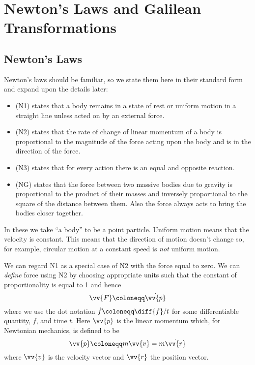 \chapter{Newton's Laws and Galilean Transformations}
    \section{Newton's Laws}
    Newton's laws should be familiar, so we state them here in their standard form and expand upon the details later:
    \begin{itemize}
    \item {} (N1) states that a body remains in a state of rest or uniform motion in a straight line unless acted on by an external force.
    
    \item {} (N2) states that the rate of change of linear momentum of a body is proportional to the magnitude of the force acting upon the body and is in the direction of the force.
    
    \item {} (N3) states that for every action there is an equal and opposite reaction.
    
    \item {} (NG) states that the force between two massive bodies due to gravity is proportional to the product of their masses and inversely proportional to the square of the distance between them.
    Also the force always acts to bring the bodies closer together.
    \end{itemize}
    
    In these we take \enquote{a body} to be a point particle.
    Uniform motion means that the velocity is constant.
    This means that the direction of motion doesn't change so, for example, circular motion at a constant speed is \emph{not} uniform motion.
    
    We can regard N1 as a special case of N2 with the force equal to zero.
    We can \emph{define} force using N2 by choosing appropriate units such that the constant of proportionality is equal to 1 and hence
    \begin{equation}
        \vv{F} \coloneqq \dot{\vv{p}}
    \end{equation}
    where we use the dot notation \(\dot{f} \coloneqq \diff{f}/{t}\) for some differentiable quantity, \(f\), and time \(t\).
    Here \(\vv{p}\) is the linear momentum which, for Newtonian mechanics, is defined to be
    \begin{equation}
        \vv{p} \coloneqq m\vv{v} = m\dot{\vv{r}}
    \end{equation}
    where \(\vv{v}\) is the velocity vector and \(\vv{r}\) the position vector.
    
